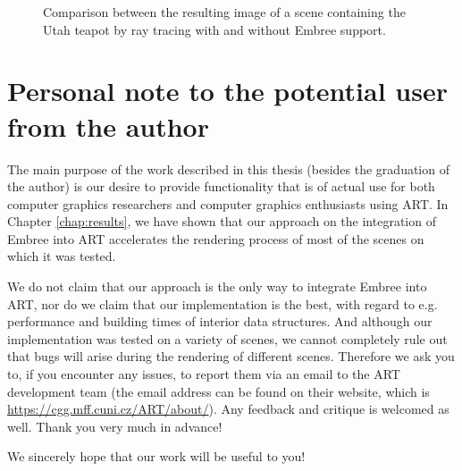 \begin{figure}[!tbp]
	\centering
	\hfill
	\caption{Comparison between the resulting image of a scene containing the Utah teapot by ray tracing with and without Embree support.}
	\label{fig:teapot}
\end{figure}

\section{Personal note to the potential user from the author}

The main purpose of the work described in this thesis (besides the graduation of the author) is our desire to provide functionality that is of actual use for both computer graphics researchers and computer graphics enthusiasts using ART. In Chapter \ref{chap:results}, we have shown that our approach on the integration of Embree into ART accelerates the rendering process of most of the scenes on which it was tested.

We do not claim that our approach is the only way to integrate Embree into ART, nor do we claim that our implementation is the best, with regard to e.g. performance and building times of interior data structures. And although our implementation was tested on a variety of scenes, we cannot completely rule out that bugs will arise during the rendering of different scenes. Therefore we ask you to, if you encounter any issues, to report them via an email to the ART development team (the email address can be found on their website, which is \href{https://cgg.mff.cuni.cz/ART/about/}{https://cgg.mff.cuni.cz/ART/about/}). Any feedback and critique is welcomed as well. Thank you very much in advance!

We sincerely hope that our work will be useful to you!